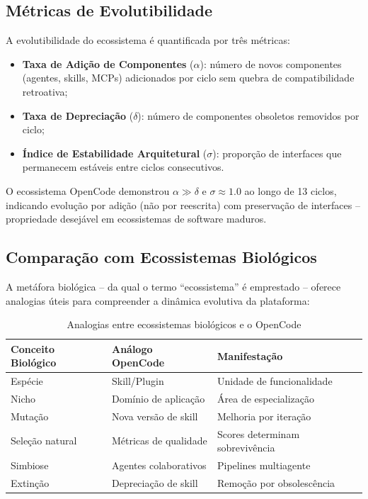 \documentclass[12pt,a4paper,sumario=tradicional]{abntex2}
\begin{document}
\subsection{Métricas de Evolutibilidade}

A evolutibilidade do ecossistema é quantificada por três métricas:

\begin{itemize}
    \item \textbf{Taxa de Adição de Componentes} ($\alpha$): número de novos componentes (agentes, skills, MCPs) adicionados por ciclo sem quebra de compatibilidade retroativa;
    \item \textbf{Taxa de Depreciação} ($\delta$): número de componentes obsoletos removidos por ciclo;
    \item \textbf{Índice de Estabilidade Arquitetural} ($\sigma$): proporção de interfaces que permanecem estáveis entre ciclos consecutivos.
\end{itemize}

O ecossistema OpenCode demonstrou $\alpha \gg \delta$ e $\sigma \approx 1.0$ ao longo de 13 ciclos, indicando evolução por adição (não por reescrita) com preservação de interfaces -- propriedade desejável em ecossistemas de software maduros.

\subsection{Comparação com Ecossistemas Biológicos}

A metáfora biológica -- da qual o termo ``ecossistema'' é emprestado -- oferece analogias úteis para compreender a dinâmica evolutiva da plataforma:

\begin{table}[H]
\centering
\caption{Analogias entre ecossistemas biológicos e o OpenCode}
\label{tab:bio-analogy}
\begin{tabular}{@{}lll@{}}
\toprule
\textbf{Conceito Biológico} & \textbf{Análogo OpenCode} & \textbf{Manifestação} \\
\midrule
Espécie & Skill/Plugin & Unidade de funcionalidade \\
Nicho & Domínio de aplicação & Área de especialização \\
Mutação & Nova versão de skill & Melhoria por iteração \\
Seleção natural & Métricas de qualidade & Scores determinam sobrevivência \\
Simbiose & Agentes colaborativos & Pipelines multiagente \\
Extinção & Depreciação de skill & Remoção por obsolescência \\
\bottomrule
\end{tabular}
\end{table}
\end{document}
